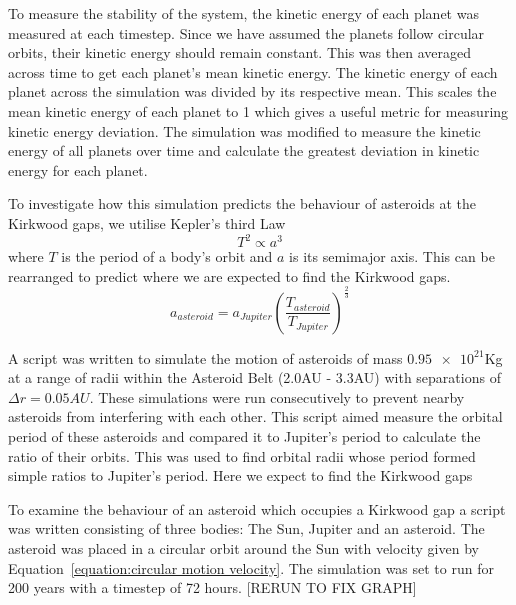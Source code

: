 \documentclass[11pt, a4paper, onecolumn]{article}
\begin{document}
To measure the stability of the system, the kinetic energy of each planet was measured at each timestep. 
Since we have assumed the planets follow circular orbits, their kinetic energy should remain constant. 
This was then averaged across time to get each planet's mean kinetic energy. 
The kinetic energy of each planet across the simulation was divided by its respective mean. 
This scales the mean kinetic energy of each planet to 1 which gives a useful metric for measuring kinetic energy deviation. 
The simulation was modified to measure the kinetic energy of all planets over time and calculate the greatest deviation in kinetic energy for each planet. 


To investigate how this simulation predicts the behaviour of asteroids at the Kirkwood gaps, we utilise Kepler's third Law 
\begin{equation}
    T^2\propto a^3
\end{equation}
where $T$ is the period of a body's orbit and $a$ is its semimajor axis.
This can be rearranged to predict where we are expected to find the Kirkwood gaps.
\begin{equation}
    a_{asteroid}=a_{Jupiter}(\frac{T_{asteroid}}{T_{Jupiter}})^{\frac{2}{3}}
    \label{equation: radii of kirkwood gaps}
\end{equation}

A script was written to simulate the motion of asteroids of mass $\num{0.95e21}$Kg at a range of radii within the Asteroid Belt (2.0AU - 3.3AU) with 
separations of $\Delta r=0.05AU$.
These simulations were run consecutively to prevent nearby asteroids from interfering with each other. 
This script aimed measure the orbital period of these asteroids and compared it to Jupiter's period to calculate the ratio of their orbits. 
This was used to find orbital radii whose period formed simple ratios to Jupiter's period. 
Here we expect to find the Kirkwood gaps  


To examine the behaviour of an asteroid which occupies a Kirkwood gap a script was written consisting of three bodies: The Sun, Jupiter and an asteroid. 
The asteroid was placed in a circular orbit around the Sun with velocity given by Equation~\ref{equation:circular motion velocity}. 
The simulation was set to run for 200 years with a timestep of 72 hours. [RERUN TO FIX GRAPH]


\end{document}
